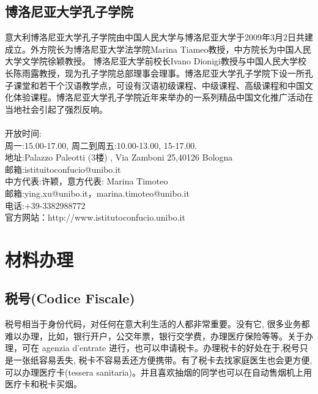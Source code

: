 \documentclass[3pt,a5paper,openright,twoside]{book}
\begin{document}
\newpage

\section{博洛尼亚大学孔子学院}

意大利博洛尼亚大学孔子学院由中国人民大学与博洛尼亚大学于2009年3月2日共建成立。外方院长为博洛尼亚大学法学院Marina Tiameo教授，中方院长为中国人民大学文学院徐颖教授。 博洛尼亚大学前校长Ivano Dionigi教授与中国人民大学校长陈雨露教授，现为孔子学院总部理事会理事。博洛尼亚大学孔子学院下设一所孔子课堂和若干个汉语教学点，可设有汉语初级课程、中级课程、高级课程和中国文化体验课程。博洛尼亚大学孔子学院近年来举办的一系列精品中国文化推广活动在当地社会引起了强烈反响。\\\\
 \noindent 开放时间:\\
周一:15.00-17.00, 周二到周五:10.00-13.00, 15-17.00.\\
地址:Palazzo Paleotti (3楼) , Via Zamboni 25,40126 Bologna \\
邮箱:istituitoconfucio@unibo.it \\
中方代表:许颖，意方代表: Marina Timoteo \\
邮箱:ying.xu@unibo.it，marina.timoteo@unibo.it \\
电话:+39-3382988772 \\
官方网站：http://www.istitutoconfucio.unibo.it



% 
%
%
%


\chapter{材料办理}                 %


\section{税号(Codice Fiscale)}
税号相当于身份代码，对任何在意大利生活的人都非常重要。没有它, 很多业务都难以办理，比如，银行开户，公交年票，银行交学费，办理医疗保险等等。关于办理，可在 agenzia d'entrate 进行，也可以申请税卡。办理税卡的好处在于,税号只是一张纸容易丢失, 税卡不容易丢还方便携带。有了税卡去找家庭医生也会更方便,可以办理医疗卡(tessera
sanitaria)。并且喜欢抽烟的同学也可以在自动售烟机上用医疗卡和税卡买烟。
\end{document}
